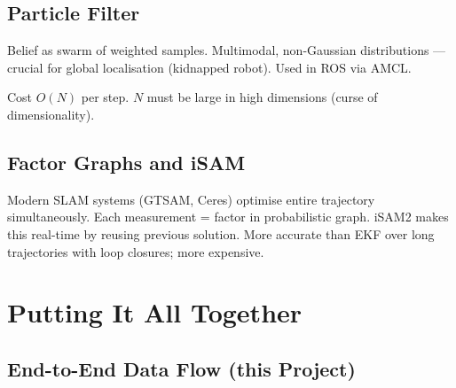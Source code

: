 \documentclass[11pt,a4paper]{article}
\begin{document}
\subsection{Particle Filter}

Belief as swarm of weighted samples. Multimodal, non-Gaussian distributions --- crucial for global localisation (kidnapped robot). Used in ROS via AMCL.

Cost $O(N)$ per step. $N$ must be large in high dimensions (curse of dimensionality).

\subsection{Factor Graphs and iSAM}

Modern SLAM systems (GTSAM, Ceres) optimise entire trajectory simultaneously. Each measurement = factor in probabilistic graph. iSAM2 makes this real-time by reusing previous solution. More accurate than EKF over long trajectories with loop closures; more expensive.

\section{Putting It All Together}

\subsection{End-to-End Data Flow (this Project)}
\end{document}
